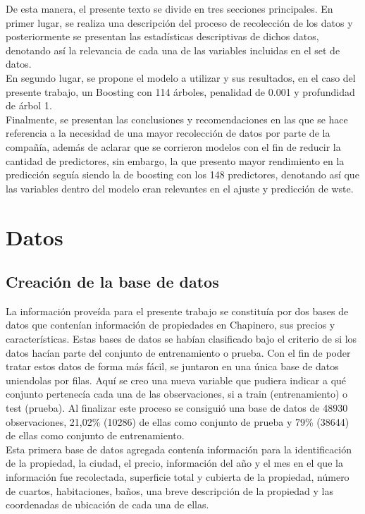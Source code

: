 \documentclass[12pt]{article}
\begin{document}
De esta manera, el presente texto se divide en tres secciones principales. En primer lugar, se realiza una descripción del proceso de recolección de los datos y posteriormente se presentan las estadísticas descriptivas de dichos datos, denotando así la relevancia de cada una de las variables incluidas en el set de datos.\\

En segundo lugar, se propone el modelo a utilizar y sus resultados, en el caso del presente trabajo, un Boosting con 114 árboles, penalidad de 0.001 y profundidad de árbol 1.\\

Finalmente, se presentan las conclusiones y recomendaciones en las que se hace referencia a la necesidad de una mayor recolección de datos por parte de la compañía, además de aclarar que se corrieron modelos con el fin de reducir la cantidad de predictores, sin embargo, la que presento mayor rendimiento en la predicción seguía siendo la de boosting con los 148 predictores, denotando así que las variables dentro del modelo eran relevantes en el ajuste y predicción de wste.

\section{Datos}
\subsection{Creación de la base de datos}
La información proveída para el presente trabajo se constituía por dos bases de datos que contenían información de propiedades en Chapinero, sus precios y  características. Estas bases de datos se habían clasificado bajo el criterio de si los datos hacían parte del conjunto de entrenamiento o prueba. Con el fin de poder tratar estos datos de forma más fácil, se juntaron en una única base de datos uniendolas por filas. Aquí se creo una nueva variable que pudiera indicar a qué conjunto pertenecía cada una de las observaciones, si a train (entrenamiento) o test (prueba). Al finalizar este proceso se consiguió una base de datos de 48930 observaciones, 21,02\% (10286) de ellas como conjunto de prueba y 79\% (38644) de ellas como conjunto de entrenamiento.\\

Esta primera base de datos agregada contenía información para la identificación de la propiedad, la ciudad, el precio, información del año y el mes en el que la información fue recolectada, superficie total y cubierta de la propiedad, número de cuartos, habitaciones, baños, una breve descripción de la propiedad y las coordenadas de ubicación de cada una de ellas. \\
\end{document}
